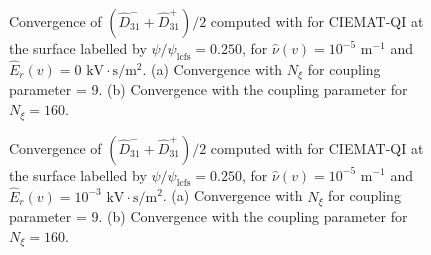 \begin{figure}[t]
	\centering	
	\begin{subfigure}[t]{0.32\textwidth}
		\caption{}
		\label{subfig:DKES_D31_convergence_Legendre_CIEMAT_QI_0250_Erho_0_Detail}
	\end{subfigure}
	\begin{subfigure}[t]{0.32\textwidth}
		\caption{}
		\label{subfig:DKES_D31_convergence_Coupling_parameter_CIEMAT_QI_0250_Erho_0}
	\end{subfigure}
	
	
	\caption{Convergence of $(\widehat{D}_{31}^- + \widehat{D}_{31}^+) /2$ computed with {\DKES} for CIEMAT-QI at the surface labelled by $\psi/\psi_{\text{lcfs}}=0.250$, for $\hat{\nu}(v)=10^{-5}$ $\text{m}^{-1}$ and $\hat{E}_r(v)=0$ $\text{kV}\cdot\text{s}/\text{m}^2$. (a) Convergence with $N_\xi$ for coupling parameter = 9. (b) Convergence with the coupling parameter for $N_\xi= 160$.}
	\label{fig:DKES_Convergence_CIEMAT_QI_Er_0}
\end{figure}


\begin{figure}[t]
	\centering	
	\begin{subfigure}[t]{0.32\textwidth}
		\caption{}
		\label{subfig:DKES_D31_convergence_Legendre_CIEMAT_QI_0250_Erho_1e-3_Detail}
	\end{subfigure}
	\begin{subfigure}[t]{0.32\textwidth}
		\caption{}
		\label{subfig:DKES_D31_convergence_Coupling_parameter_CIEMAT_QI_0250_Erho_1e-3}
	\end{subfigure}
	
	
	\caption{Convergence of $(\widehat{D}_{31}^- + \widehat{D}_{31}^+) /2$ computed with {\DKES} for CIEMAT-QI at the surface labelled by $\psi/\psi_{\text{lcfs}}=0.250$, for $\hat{\nu}(v)=10^{-5}$ $\text{m}^{-1}$ and $\hat{E}_r(v)=10^{-3}$ $\text{kV}\cdot\text{s}/\text{m}^2$. (a) Convergence with $N_\xi$ for coupling parameter = 9. (b) Convergence with the coupling parameter for $N_\xi= 160$.}
	\label{fig:DKES_Convergence_CIEMAT_QI_Er_1e-3}
\end{figure}

%
%